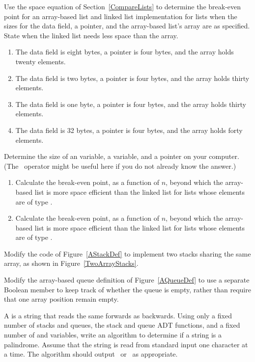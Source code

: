 \begin{exercises}
\item
Use the space equation of Section~\ref{CompareLists} to determine the
break-even point for an array-based list and linked list
implementation for lists when the sizes for the data field,
a pointer, and the array-based list's array are as specified.
State when the linked list needs less space than the array.
\begin{enumerate}
\item The data field is eight bytes, a pointer is four bytes, and the
array holds twenty elements.
\item The data field is two bytes, a pointer is four bytes, and the
array holds thirty elements.
\item The data field is one byte, a pointer is four bytes, and the
array holds thirty elements.
\item The data field is 32 bytes, a pointer is four bytes, and the
array holds forty elements.
\end{enumerate}

\item
Determine the size of an  variable, a 
variable, and a pointer on your computer.
{(The \Lang\ operator  might be useful here if you do not
already know the answer.)}{}
\begin{enumerate}
\item
Calculate the break-even point, as a function of \(n\), beyond which
the array-based list is more space efficient than the linked list for
lists whose elements are of type .
\item
Calculate the break-even point, as a function of \(n\), beyond which
the array-based list is more space efficient than the linked list for
lists whose elements are of type .
\end{enumerate}

\item
Modify the code of Figure~\ref{AStackDef} to implement two stacks sharing
the same array, as shown in Figure~\ref{TwoArrayStacks}.

\item
Modify the array-based queue definition of Figure~\ref{AQueueDef} to
use a separate Boolean member to keep track of whether the queue is
empty, rather than require that one array position remain empty.

\item
A  is a string that reads
the same forwards as backwards.
Using only a fixed number of stacks and queues, the stack and queue
ADT functions, and a fixed number of  and 
variables, write an algorithm to determine if a string is a
palindrome.
Assume that the string is read from standard input one character at a time.
The algorithm should output \TRUE\ or \FALSE\ as appropriate.


\end{exercises}

